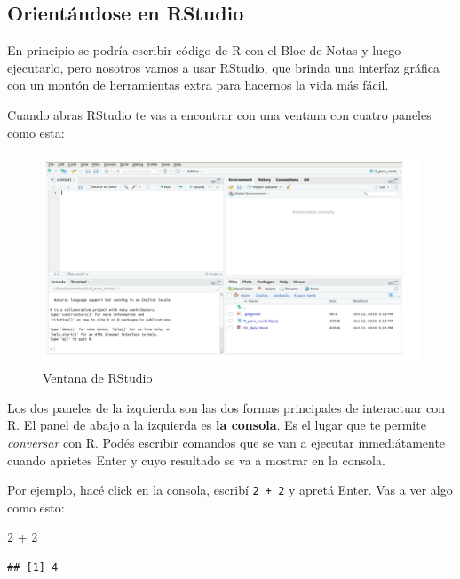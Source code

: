 \documentclass[
  openany]{book}
\newenvironment{Shaded}{\begin{snugshade}}{\end{snugshade}}
\newcommand{\DecValTok}[1]{\textcolor[rgb]{0.00,0.00,0.81}{#1}}
\newcommand{\SpecialCharTok}[1]{\textcolor[rgb]{0.00,0.00,0.00}{#1}}
\begin{document}
\hypertarget{orientuxe1ndose-en-rstudio}{%
\subsection{Orientándose en RStudio}\label{orientuxe1ndose-en-rstudio}}

En principio se podría escribir código de R con el Bloc de Notas y luego ejecutarlo, pero nosotros vamos a usar RStudio, que brinda una interfaz gráfica con un montón de herramientas extra para hacernos la vida más fácil.

Cuando abras RStudio te vas a encontrar con una ventana con cuatro paneles como esta:

\begin{figure}
\centering
\includegraphics{img/rstudio.png}
\caption{Ventana de RStudio}
\end{figure}

Los dos paneles de la izquierda son las dos formas principales de interactuar con R.
El panel de abajo a la izquierda es \textbf{la consola}.
Es el lugar que te permite \emph{conversar} con R.
Podés escribir comandos que se van a ejecutar inmediátamente cuando aprietes Enter y cuyo resultado se va a mostrar en la consola.

Por ejemplo, hacé click en la consola, escribí \texttt{2\ +\ 2} y apretá Enter.
Vas a ver algo como esto:

\begin{Shaded}
\begin{Highlighting}[]
\DecValTok{2} \SpecialCharTok{+} \DecValTok{2}
\end{Highlighting}
\end{Shaded}

\begin{verbatim}
## [1] 4
\end{verbatim}
\end{document}
